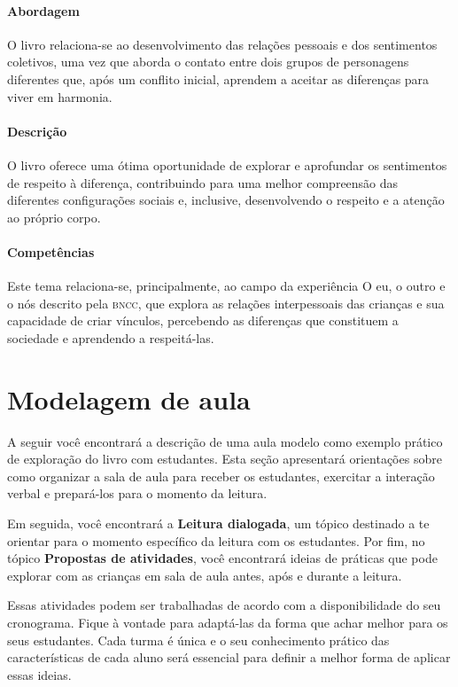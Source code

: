 \documentclass[11pt]{extarticle}
\begin{document}
\paragraph{Abordagem} O livro relaciona-se ao desenvolvimento das relações pessoais e dos sentimentos coletivos, uma vez que aborda o contato entre dois grupos de personagens diferentes que, após um conflito inicial, aprendem a aceitar as diferenças para viver em harmonia.

\paragraph{Descrição} O livro oferece uma ótima oportunidade de explorar 
e aprofundar os sentimentos de respeito à diferença, contribuindo para uma melhor compreensão das diferentes configurações sociais e, inclusive, desenvolvendo o respeito e a atenção ao próprio corpo.

\paragraph{Competências} Este tema relaciona-se, principalmente, ao 
campo da experiência O eu, o outro e o nós 
descrito pela \textsc{bncc}, que explora as relações interpessoais das crianças e sua capacidade de criar vínculos, percebendo as diferenças que constituem a sociedade e aprendendo a respeitá-las.


\section{Modelagem de aula}
A seguir você encontrará a descrição de uma aula modelo como exemplo 
prático de exploração do livro com estudantes. Esta seção apresentará 
orientações sobre como organizar a sala de aula para receber os 
estudantes, exercitar a interação verbal e prepará-los para o 
momento da leitura.

Em seguida, você encontrará a \textbf{Leitura dialogada}, um 
tópico destinado a te orientar para o momento específico da 
leitura com os estudantes. Por fim, no tópico 
\textbf{Propostas de atividades}, você encontrará ideias 
de práticas que pode explorar com as crianças em sala de 
aula antes, após e durante a leitura. 

Essas atividades podem ser trabalhadas de acordo com a 
disponibilidade do seu cronograma. Fique à vontade para adaptá-las 
da forma que achar melhor para os seus estudantes. Cada turma é única 
e o seu conhecimento prático das características de cada aluno será 
essencial para definir a melhor forma de aplicar essas ideias. 
\end{document}
